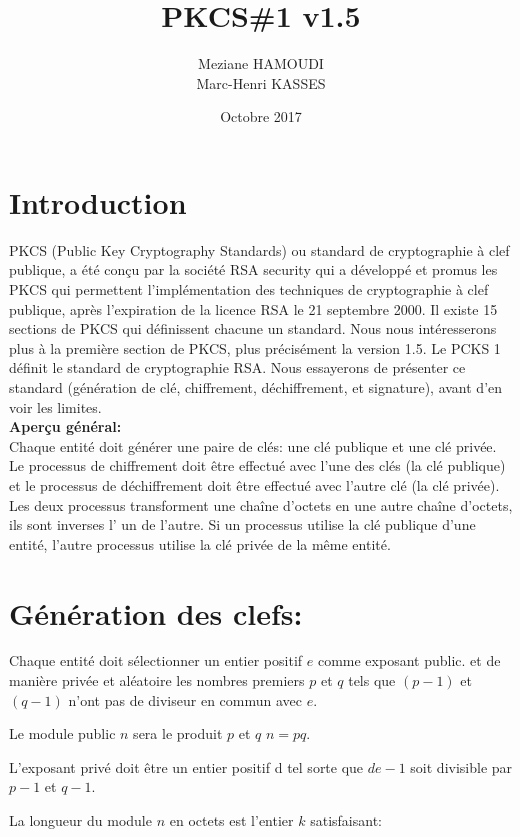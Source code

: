 \documentclass{article}
\title{PKCS\#1 v1.5}
\author{Meziane HAMOUDI\\Marc-Henri KASSES}
\date{Octobre 2017}
\begin{document}
\maketitle
\newpage

\newtheorem{Definition}{Définition}[section]

\section{Introduction} 
PKCS (Public Key Cryptography Standards) ou standard de cryptographie à clef publique, a été conçu par la société RSA security qui a développé et promus les PKCS qui permettent l’implémentation des techniques de  cryptographie à clef publique, après l’expiration de la licence RSA le 21 septembre 2000.  
Il existe 15 sections de PKCS qui définissent chacune un standard. Nous nous intéresserons plus à  la première section de PKCS, plus précisément la version 1.5. Le PCKS 1 définit le standard de cryptographie RSA. Nous essayerons de présenter ce standard (génération de clé, chiffrement, déchiffrement, et signature), avant d'en voir les limites.
\\

\textbf{Aperçu général:}\\
Chaque entité doit générer une paire de clés: une clé publique et une clé privée. Le processus de chiffrement doit être effectué avec l'une des clés (la clé publique) et le processus de déchiffrement doit être effectué avec l'autre clé (la clé privée).
Les deux processus transforment une chaîne d'octets en une autre chaîne d'octets, ils sont inverses l’ un de l’autre. Si un processus utilise la clé publique d’une entité, l'autre processus utilise la clé privée de la même entité.


\section{Génération des clefs:}
Chaque entité doit sélectionner un entier positif $e$ comme exposant public. et de manière privée et aléatoire les nombres premiers $p$ et $q$ tels que $(p-1)$ et $(q-1)$ n’ont pas de diviseur en commun avec $e$.

Le module public $n$ sera le produit $p$ et $q$  $n = pq$.

L'exposant privé doit être un entier positif d tel  sorte que $de-1$ soit divisible par $p-1$ et $q-1$.

 La longueur du module $n$ en octets est l'entier $k$ satisfaisant:
\end{document}
